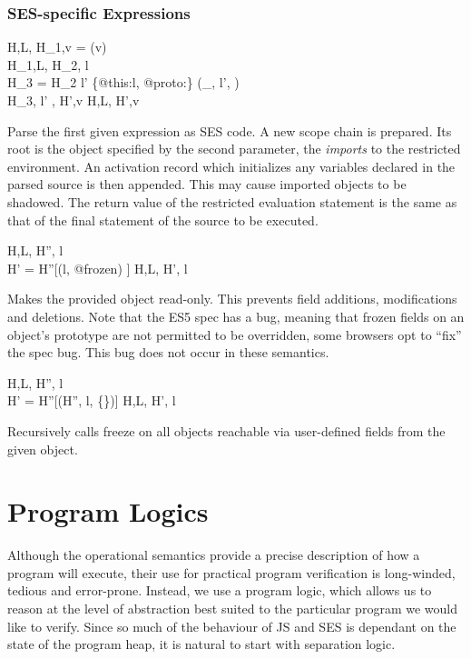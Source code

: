 \documentclass[a4paper,notitlepage]{report}
\begin{document}
  \subsection{SES-specific Expressions}

  {H,L, \gevalsto H_1,v \qquad
    = \parse(v) \\
   H_1,L, \gevalsto H_2, l \\
   H_3 = H_2 \disju l' \pointsto \{@this:l, @proto:\nil\} \disju
     (\_, l', ) \\
   H_3, l' \cons [l],  \gevalsto H',v }
  {H,L, \evalsto H',v}

Parse the first given expression as SES code.
A new scope chain is prepared. Its root is the
object specified by the second parameter, the \emph{imports} to the restricted
environment.
An activation record which initializes any variables declared in the parsed
source is then appended. This may cause imported objects to be shadowed.
The return value of the restricted evaluation statement is the same as that of
the final statement of the source to be executed.

  {H,L, \gevalsto H'', l\\
   H' = H''[(l, @frozen) \pointsto \true]}
  {H,L, \evalsto H', l}

Makes the provided object read-only. This prevents field additions,
modifications and deletions.
Note that the ES5 spec has a bug, meaning that frozen fields on an object's
prototype are not permitted to be overridden, some browsers opt to ``fix'' the spec bug.
This bug does not occur in these semantics.

  {H,L, \gevalsto H'', l \\
   H' = H''[\auxDef(H'', l, \{\})]}
  {H,L, \evalsto H', l}

Recursively calls freeze on all objects reachable
via user-defined fields from the given object.

\chapter{Program Logics}
\label{chap:proglogic}
Although the operational semantics provide a precise description of how a
program will execute, their use for practical program verification is
long-winded, tedious and error-prone. Instead, we use a program logic, which
allows us to reason at the level of abstraction best suited to the particular
program we would like to verify. Since so much of the behaviour of JS and SES is
dependant on the state of the program heap, it is natural to start with
separation logic.
\end{document}

